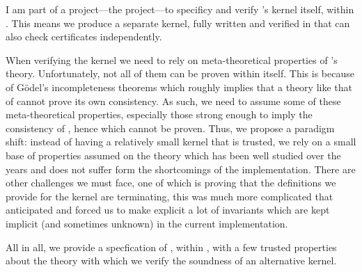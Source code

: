 I am part of a project---the \MetaCoq project---to specificy and verify \Coq's
kernel itself, within \Coq. This means we produce a separate kernel, fully
written and verified in \Coq that can also check certificates independently.

When verifying the kernel we need to rely on meta-theoretical properties of
\Coq's theory. Unfortunately, not all of them can be proven within \Coq itself.
%
This is because of Gödel's incompleteness theorems which roughly implies that a
theory like that of \Coq cannot prove its own consistency. As such, we need to
assume some of these meta-theoretical properties, especially those strong enough
to imply the consistency of \Coq, hence which cannot be proven.
Thus, we propose a paradigm shift: instead of having a relatively small kernel
that is trusted, we rely on a small base of properties assumed on the theory
which has been well studied over the years and does not suffer form the
shortcomings of the implementation.
There are other challenges we must face, one of which is proving that the
definitions we provide for the kernel are terminating, this was much more
complicated that anticipated and forced us to make explicit a lot of invariants
which are kept implicit (and sometimes unknown) in the current implementation.

All in all, we provide a specfication of \Coq, within \Coq, with a few trusted
properties about the theory with which we verify the soundness of an alternative
\Coq kernel.

